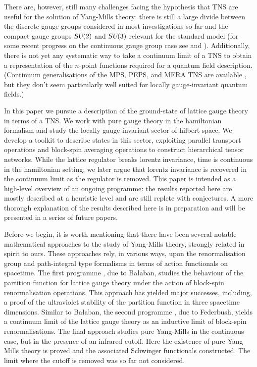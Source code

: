 \documentclass[twocolumn,lengthcheck,superscriptaddress]{revtex4-1}
\def\su2{\textsl{SU}(2)}
\theoremstyle{definition}
\theoremstyle{remark}
\begin{document}
There are, however, still many challenges facing the hypothesis that TNS are useful for the solution of Yang-Mills theory: there is still a large divide between the discrete gauge groups considered in most investigations so far and the compact gauge groups $\su2$ and $\textsl{SU}(3)$ relevant for the standard model (for some recent progress on the continuous gauge group case see \cite{tagliacozzo_tensor_2014} and \cite{silvi_lattice_2014}). Additionally, there is not yet any systematic way to take a continuum limit of a TNS to obtain a representation of the $n$-point  functions required for a quantum field description. (Continuum generalisations of the MPS, PEPS, and MERA TNS are available \cite{haegeman:2011a}, but they don't seem particularly well suited for locally gauge-invariant quantum fields.)

In this paper we pursue a description of the ground-state of lattice gauge theory in terms of a TNS. We work with pure gauge theory in the hamiltonian formalism \cite{kogut:1975a} and study the locally gauge invariant sector of hilbert space.  We develop a toolkit to describe states in this sector, exploiting parallel transport operations and block-spin averaging operations to construct hierarchical tensor networks. While the lattice regulator breaks lorentz invariance, time is continuous in the hamiltonian setting; we later argue that lorentz invariance is recovered in the continuum limit as the regulator is removed. This paper is intended as a high-level overview of an ongoing programme: the results reported here are mostly described at a heuristic level and are still replete with conjectures. A more thorough explanation of the results described here is in preparation and will be presented in a series of future papers.

Before we begin, it is worth mentioning that there have been several notable mathematical approaches to the study of Yang-Mills theory, strongly related in spirit to ours. These approaches rely, in various ways, upon the renormalisation group \cite{wilson:1975a} and path-integral type formalisms in terms of action functionals on spacetime. The first programme \cite{balaban:1985a,balaban:1988a,balaban:1984a,balaban:1984b,balaban:1985b,balaban:1985c,balaban:1985d,balaban:1989a,balaban:1989b,balaban:1987a,balaban:1988b}, due to Ba{\l}aban, studies the behaviour of the partition function for lattice gauge theory under the action of block-spin renormalisation operations. This approach has yielded major successes, including, a proof of the ultraviolet stability of the partition function \cite{balaban:1985d} in three spacetime dimensions. Similar to Ba{\l}aban, the second programme \cite{federbush:1987a,federbush:1986a,federbush:1987b,federbush:1987c,federbush:1988a,federbush:1990a}, due to Federbush, yields a continuum limit of the lattice gauge theory as an inductive limit of block-spin renormalisations. The final approach \cite{magnen:1993a} studies pure Yang-Mills in the continuous case, but in the presence of an infrared cutoff. Here the existence of pure Yang-Mills theory is proved and the associated Schwinger functionals constructed. The limit where the cutoff is removed was so far not considered.
\end{document}
